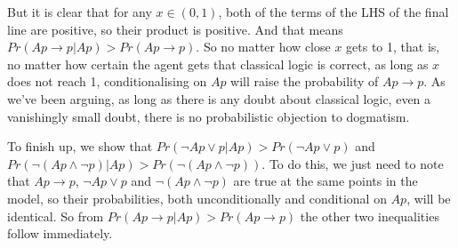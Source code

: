 \noindent But it is clear that for any $x \in (0,1)$, both of the terms of the LHS of the final line are positive, so their product is positive. And that means  $Pr(Ap \rightarrow p | Ap) > Pr(Ap \rightarrow p)$. So no matter how close $x$ gets to 1, that is, no matter how certain the agent gets that classical logic is correct, as long as $x$ does not reach 1, conditionalising on $Ap$ will raise the probability of $Ap \rightarrow p$. As we've been arguing, as long as there is any doubt about classical logic, even a vanishingly small doubt, there is no probabilistic objection to dogmatism.

To finish up, we show that $Pr(\neg Ap \vee p | Ap) > Pr(\neg Ap \vee p)$ and $Pr(\neg(Ap \wedge \neg p) | Ap) > Pr(\neg(Ap \wedge \neg p))$. To do this, we just need to note that $Ap \rightarrow p$, $\neg Ap \vee p$ and $\neg(Ap \wedge \neg p)$ are true at the same points in the model, so their probabilities, both unconditionally and conditional on $Ap$, will be identical. So from $Pr(Ap \rightarrow p | Ap) > Pr(Ap \rightarrow p)$ the other two inequalities follow immediately.

\renewcommand{\labelenumi}{(\arabic{enumi})}
